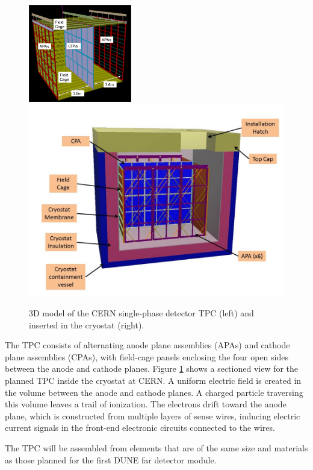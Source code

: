\begin{figure}[htb]
\centering
\begin{minipage}[b]{1.0\textwidth}
\begin{center}
\includegraphics[width=0.40\textwidth]{figures/CERN_single_TPC}
\includegraphics[width=.59\textwidth]{figures/TPC-3D-section.jpg}
\end{center}
\end{minipage}
\caption{\small 3D model of the CERN single-phase detector TPC (left) and inserted in the cryostat (right).}
\label{fig:CERNdet-overview}
\end{figure}

The TPC consists of alternating anode plane assemblies (APAs) and cathode plane assemblies (CPAs), with field-cage panels enclosing the four open sides between the anode and cathode planes.  Figure  \ref{fig:CERNdet-overview} shows a sectioned view for the planned TPC inside the cryostat at CERN.  A uniform electric field is created in the volume between the anode and cathode planes. A charged particle traversing this volume leaves a trail of ionization. The electrons drift toward the anode plane, which is constructed from multiple layers of sense wires, inducing electric current signals in the front-end electronic circuits connected to the wires.

The TPC will be assembled from elements that are of the same size and materials as those planned for the first DUNE far detector module.  


